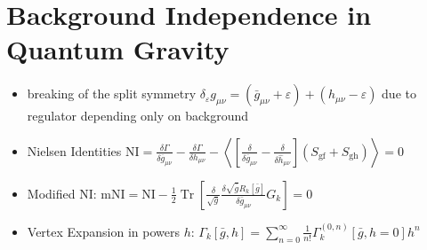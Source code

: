 \chapter{Background Independence in Quantum Gravity}\label{chap:BGindependence}
\begin{itemize}
	\item breaking of the split symmetry   $\delta_{\varepsilon}g_{\mu\nu} = \left(\bar{g}_{\mu\nu} + \varepsilon\right) +  \left(h_{\mu\nu} - \varepsilon\right)$ due to regulator depending only on background 
	\item Nielsen Identities $\mathrm{NI}=\frac{\delta \Gamma}{\delta \overline{g}_{\mu \nu}}-\frac{\delta \Gamma}{\delta h_{\mu \nu}}-\left\langle\left[\frac{\delta}{\delta \overline{g}_{\mu \nu}}-\frac{\delta}{\delta \hat{h}_{\mu \nu}}\right]\left(S_{\mathrm{gf}}+S_{\mathrm{gh}}\right)\right\rangle= 0$
	\item Modified NI: $\mathrm{mNI}=\mathrm{NI}-\frac{1}{2} \operatorname{Tr}\left[\frac{\delta}{\sqrt{g}} \frac{\delta \sqrt{\bar{g}} R_{k}[\bar{g}]}{\delta \bar{g}_{\mu \nu}} G_{k}\right]=0$
	\item Vertex Expansion in powers $h$: $\Gamma_{k}[\bar{g}, h]=\sum_{n=0}^{\infty} \frac{1}{n !} \Gamma_{k}^{(0, n)}[\bar{g}, h=0] h^{n}$

	
\end{itemize}
 